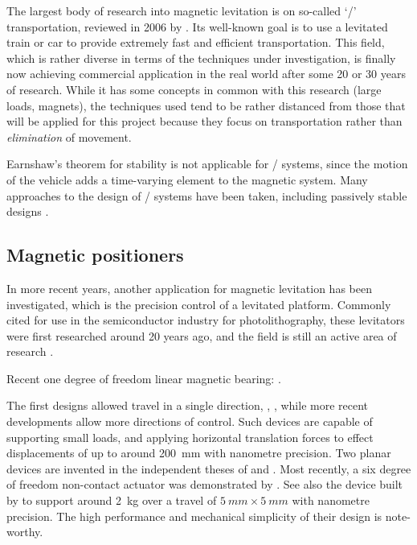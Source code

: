 The largest body of research into magnetic levitation is on so-called `\maglev/'
transportation, reviewed in 2006 by \textcite{lee2006}.
Its well-known goal is to use a levitated train or car to provide extremely fast and efficient transportation.
This field, which is rather diverse in terms of the techniques under investigation, is finally now achieving commercial application in the real world after some 20 or 30 years
of research.
While it has some concepts in common with this research (large loads, magnets), the techniques used tend to be rather distanced from those that will be applied for this project because they focus on transportation rather than \emph{elimination} of movement.

Earnshaw's theorem for stability is not applicable for \maglev/ systems, since the motion of the vehicle adds a time-varying element to the magnetic system.
Many approaches to the design of \maglev/ systems have been taken, including passively stable designs \cite{musolino2009}.

\subsection{Magnetic positioners}

In more recent years, another application for magnetic levitation has been investigated, which is the precision control of a levitated platform.
Commonly cited for use in the semiconductor industry for photolithography, these levitators were first researched around 20 years ago, and the field is still an active area of research \cite{fulford2008,fulford2009}.

Recent one degree of freedom linear magnetic bearing: \cite{ro2009-preeng}.

The first designs allowed travel in a single direction, \eg, \textcite{trumper1992}, while more recent developments allow more directions of control.
Such devices are capable of supporting small loads, and applying horizontal translation forces to effect displacements of up to around \SI{200}{mm} with nanometre precision.
Two planar devices are invented in the independent theses of \textcite{kim1997} and \textcite{molenaar2000}.
Most recently, a six degree of freedom non-contact actuator was demonstrated by \textcite{verma2004}.
See also the device built by \textcite{kim2007} to support around \SI{2}{kg} over a travel of $\SI{5}{mm}\times\SI{5}{mm}$ with nanometre precision.
The high performance and mechanical simplicity of their design is note-worthy.


